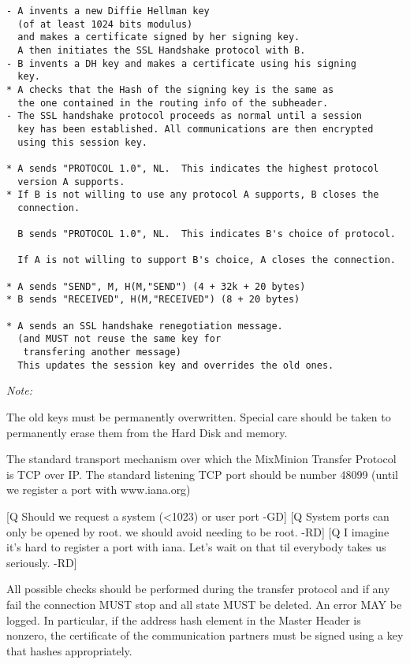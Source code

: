 \begin{verbatim}
- A invents a new Diffie Hellman key 
  (of at least 1024 bits modulus)
  and makes a certificate signed by her signing key.
  A then initiates the SSL Handshake protocol with B.
- B invents a DH key and makes a certificate using his signing
  key.
* A checks that the Hash of the signing key is the same as
  the one contained in the routing info of the subheader.
- The SSL handshake protocol proceeds as normal until a session
  key has been established. All communications are then encrypted
  using this session key.

* A sends "PROTOCOL 1.0", NL.  This indicates the highest protocol
  version A supports.
* If B is not willing to use any protocol A supports, B closes the 
  connection.

  B sends "PROTOCOL 1.0", NL.  This indicates B's choice of protocol.

  If A is not willing to support B's choice, A closes the connection.
  
* A sends "SEND", M, H(M,"SEND") (4 + 32k + 20 bytes)
* B sends "RECEIVED", H(M,"RECEIVED") (8 + 20 bytes)

* A sends an SSL handshake renegotiation message.
  (and MUST not reuse the same key for 
   transfering another message)
  This updates the session key and overrides the old ones.
\end{verbatim}

\emph{Note:}

The old keys must be permanently overwritten. Special care should be
taken to permanently erase them from the Hard Disk and memory. 

The standard transport mechanism over which the MixMinion Transfer
Protocol is TCP over IP. The standard listening TCP port should be 
number 48099 (until we register a port with www.iana.org)

[Q Should we request a system (<1023) or user port -GD]
[Q System ports can only be opened by root. we should avoid needing
to be root. -RD]
[Q I imagine it's hard to register a port with iana. Let's wait on
that til everybody takes us seriously. -RD]

All possible checks should be performed during the transfer protocol
and if any fail the connection MUST stop and all state MUST
be deleted. An error MAY be logged. In particular, if the address
hash element in the Master Header is nonzero, the certificate of
the communication partners must be signed using a key that hashes
appropriately.

